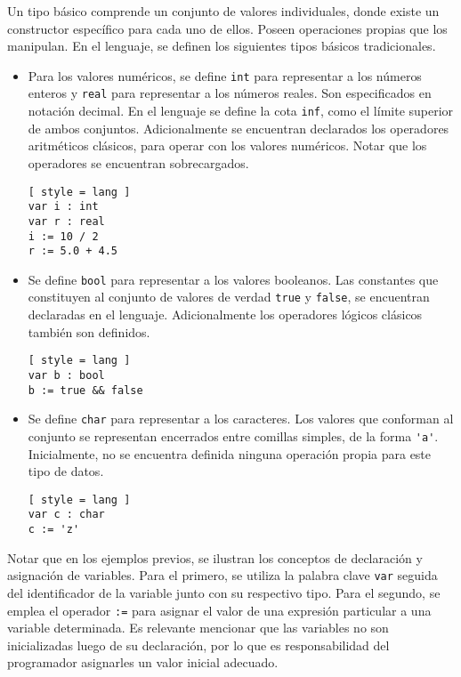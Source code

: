 Un tipo básico comprende un conjunto de valores individuales, donde existe un constructor específico para cada uno de ellos.
Poseen operaciones propias que los manipulan.
En el lenguaje, se definen los siguientes tipos básicos tradicionales.
\begin{itemize}
\item
Para los valores numéricos, se define \lstinline[style = lang]{int} para representar a los números enteros y \lstinline[style = lang]{real} para representar a los números reales.
Son especificados en notación decimal.
En el lenguaje se define la cota \lstinline[style = lang]{inf}, como el límite superior de ambos conjuntos.
Adicionalmente se encuentran declarados los operadores aritméticos clásicos, para operar con los valores numéricos.
Notar que los operadores se encuentran sobrecargados.
\begin{lstlisting}[ style = lang ]
var i : int
var r : real
i := 10 / 2
r := 5.0 + 4.5
\end{lstlisting}
\item
Se define \lstinline[style = lang]{bool} para representar a los valores booleanos.
Las constantes que constituyen al conjunto de valores de verdad \lstinline[style = lang]{true} y \lstinline[style = lang]{false}, se encuentran declaradas en el lenguaje.
Adicionalmente los operadores lógicos clásicos también son definidos.
\begin{lstlisting}[ style = lang ]
var b : bool
b := true && false
\end{lstlisting}
\item
Se define \lstinline[style = lang]{char} para representar a los caracteres.
Los valores que conforman al conjunto se representan encerrados entre comillas simples, de la forma \lstinline[style = lang]{'a'}.
Inicialmente, no se encuentra definida ninguna operación propia para este tipo de datos.
\begin{lstlisting}[ style = lang ]
var c : char
c := 'z'
\end{lstlisting}
\end{itemize}

Notar que en los ejemplos previos, se ilustran los conceptos de declaración y asignación de variables.
Para el primero, se utiliza la palabra clave \lstinline[style = lang]{var} seguida del identificador de la variable junto con su respectivo tipo.
Para el segundo, se emplea el operador \lstinline[style = lang]{:=} para asignar el valor de una expresión particular a una variable determinada.
Es relevante mencionar que las variables no son inicializadas luego de su declaración, por lo que es responsabilidad del programador asignarles un valor inicial adecuado.

